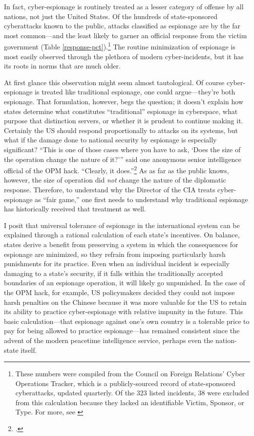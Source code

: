 \documentclass[14pt]{extarticle}
\begin{document}
In fact, cyber-espionage is routinely treated as a lesser category of offense by all nations, not just the United States. Of the hundreds of state-sponsored cyberattacks known to the public, attacks classified as espionage are by the far most common---and the least likely to garner an official response from the victim government (Table \ref{response-pct}).\footnote{These numbers were compiled from the Council on Foreign Relations' Cyber Operations Tracker, which is a publicly-sourced record of state-sponsored cyberattacks, updated quarterly. Of the 323 listed incidents, 38 were excluded from this calculation because they lacked an identifiable Victim, Sponsor, or Type. For more, see \cite{council_on_foreign_relations_new_2019}} The routine minimization of espionage is most easily observed through the plethora of modern cyber-incidents, but it has its roots in norms that are much older.

At first glance this observation might seem almost tautological. Of course cyber-espionage is treated like traditional espionage, one could argue---they're both espionage. That formulation, however, begs the question; it doesn't explain how states determine what constitutes \enquote{traditional} espionage in cyberspace, what purpose that distinction servers, or whether it is prudent to continue making it. Certainly the US should respond proportionally to attacks on its systems, but what if the damage done to national security by espionage is especially significant? ``This is one of those cases where you have to ask, `Does the size of the operation change the nature of it?'\thinspace'' said one anonymous senior intelligence official of the OPM hack. ``Clearly, it does.''\footcite{sanger_u.s._2015} As as far as the public knows, however, the size of operation did \emph{not} change the nature of the diplomatic response. Therefore, to understand why the Director of the CIA treats cyber-espionage as \enquote{fair game,} one first needs to understand why traditional espionage has historically received that treatment as well.

I posit that universal tolerance of espionage in the international system can be explained through a rational calculation of each state's incentives. On balance, states derive a benefit from preserving a system in which the consequences for espionage are minimized, so they refrain from imposing particularly harsh punishments for its practice. Even when an individual incident is especially damaging to a state's security, if it falls within the traditionally accepted boundaries of an espionage operation, it will likely go unpunished. In the case of the OPM hack, for example, US policymakers decided they could not impose harsh penalties on the Chinese because it was more valuable for the US to retain its ability to practice cyber-espionage with relative impunity in the future. This basic calculation---that espionage against one's own country is a tolerable price to pay for being allowed to practice espionage---has remained consistent since the advent of the modern peacetime intelligence service, perhaps even the nation-state itself.
\end{document}
